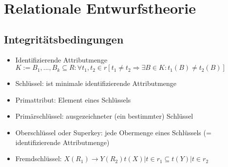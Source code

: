 \documentclass{scrartcl}
\begin{document}
\section{Relationale Entwurfstheorie}

\subsection{Integritätsbedingungen}

\begin{itemize}
	\itemsep0em
	\item Identifizierende Attributmenge $K := {B_1, . . . , B_k} \subseteq R: \forall t_1, t_2 \in r [t_1 \neq t_2 \Rightarrow  \exists B \in K : t_1(B) \neq t_2(B)]$
	\item Schlüssel: ist minimale identifizierende Attributmenge
	\item Primattribut: Element eines Schlüssels
	\item Primärschlüssel: ausgezeichneter (ein bestimmter) Schlüssel
	\item Oberschlüssel oder Superkey: jede Obermenge eines Schlüssels (= identifizierende Attributmenge)
	\item Fremdschlüssel: $X(R_1) \rightarrow Y(R_2) {t(X)|t \in r_1} \subseteq {t(Y)|t \in r_2}$
\end{itemize}
\end{document}
